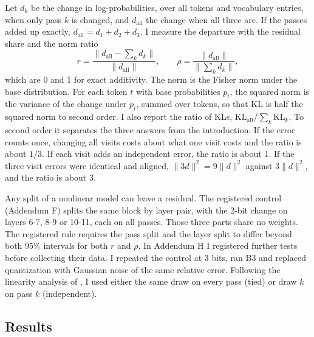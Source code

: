 \documentclass[11pt,a4paper]{article}
\begin{document}
Let $d_k$ be the change in log-probabilities, over all tokens and vocabulary entries, when only pass $k$ is changed, and $d_{\text{all}}$ the change when all three are. If the passes added up exactly, $d_{\text{all}} = d_1 + d_2 + d_3$. I measure the departure with the residual share and the norm ratio
\begin{equation}
r = \frac{\lVert d_{\text{all}} - \sum_k d_k \rVert}{\lVert d_{\text{all}} \rVert}, \qquad
\rho = \frac{\lVert d_{\text{all}} \rVert}{\lVert \sum_k d_k \rVert},
\end{equation}
which are 0 and 1 for exact additivity. The norm is the Fisher norm under the base distribution. For each token $t$ with base probabilities $p_t$, the squared norm is the variance of the change under $p_t$, summed over tokens, so that KL is half the squared norm to second order. I also report the ratio of KLs, $\mathrm{KL}_{\text{all}} / \sum_k \mathrm{KL}_k$. To second order it separates the three answers from the introduction. If the error counts once, changing all visits costs about what one visit costs and the ratio is about $1/3$. If each visit adds an independent error, the ratio is about 1. If the three visit errors were identical and aligned, $\lVert 3d \rVert^2 = 9 \lVert d \rVert^2$ against $3 \lVert d \rVert^2$, and the ratio is about 3.

Any split of a nonlinear model can leave a residual. The registered control (Addendum F) splits the same block by layer pair, with the 2-bit change on layers 6-7, 8-9 or 10-11, each on all passes. Those three parts share no weights. The registered rule requires the pass split and the layer split to differ beyond both 95\% intervals for both $r$ and $\rho$. In Addendum H I registered further tests before collecting their data. I repeated the control at 3 bits, ran B3 and replaced quantization with Gaussian noise of the same relative error. Following the linearity analysis of \citet{linearity}, I used either the same draw on every pass (tied) or draw $k$ on pass $k$ (independent).

\subsection{Results}
\end{document}
